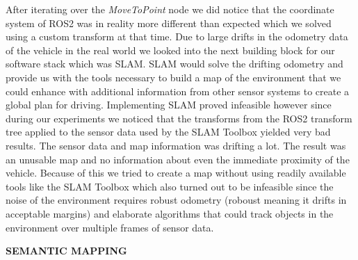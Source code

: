 After iterating over the \textit{MoveToPoint} node we did notice that the coordinate system of ROS2 was in reality more different than expected which we solved using a custom transform at that time. Due to large drifts in the odometry data of the vehicle in the real world we looked into the next building block for our software stack which was SLAM. SLAM would solve the drifting odometry and provide us with the tools necessary to build a map of the environment that we could enhance with additional information from other sensor systems to create a global plan for driving. Implementing SLAM proved infeasible however since during our experiments we noticed that the transforms from the ROS2 transform tree applied to the sensor data used by the SLAM Toolbox yielded very bad results. The sensor data and map information was drifting a lot. The result was an unusable map and no information about even the immediate proximity of the vehicle. Because of this we tried to create a map without using readily available tools like the SLAM Toolbox which also turned out to be infeasible since the noise of the environment requires robust odometry (roboust meaning it drifts in acceptable margins) and elaborate algorithms that could track objects in the environment over multiple frames of sensor data.

\textbf{SEMANTIC MAPPING}

